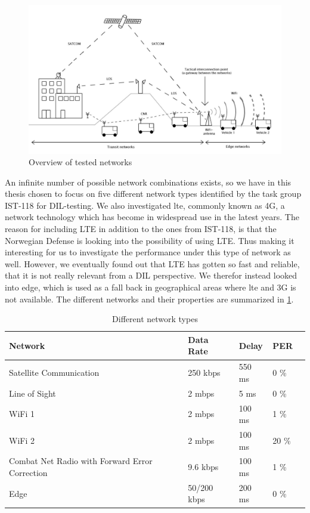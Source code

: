 \begin{figure}[h]
\includegraphics[scale=0.25]{images/networks_overview.pdf}
\caption{Overview of tested networks}
\label{figure-networks-overview}
\end{figure}

An infinite number of possible network combinations exists, so we have in this
thesis chosen to focus on five different network types identified by the task
group IST-118 for DIL-testing. We also investigated \gls{lte}, commonly known as
4G, a network technology which has become in widespread use in the latest years.
The reason for including LTE in addition to the ones from IST-118, is that the
Norwegian Defense is looking into the possibility of using LTE. Thus making it
interesting for us to investigate the performance under this type of network as
well. However, we eventually found out that LTE has gotten so fast and reliable,
that it is not really relevant from a DIL perspective. We therefor instead
looked into \gls{edge}, which is used as a fall back in geographical areas where
\gls{lte} and 3G is not available. The different networks and their properties
are summarized in \cref{table-network-types}.

\begin{table}[h]
\begin{tabular}{| l | l | l | l | l |}
\hline
  \textbf{Network} & \textbf{Data Rate} & \textbf{Delay} & \textbf{PER} \\ \hline
  Satellite Communication & 250 kbps & 550 ms & 0 \% \\ \hline
  Line of Sight & 2 mbps & 5 ms & 0 \% \\ \hline
  WiFi 1 & 2 mbps & 100 ms & 1 \% \\ \hline
  WiFi 2 & 2 mbps & 100 ms & 20 \% \\ \hline
  Combat Net Radio with Forward Error Correction & 9.6 kbps & 100 ms & 1 \% \\ \hline
  Edge & 50/200 kbps & 200 ms & 0 \% \\ \hline
\end{tabular}
\caption{Different network types}
\label{table-network-types}
\end{table}



